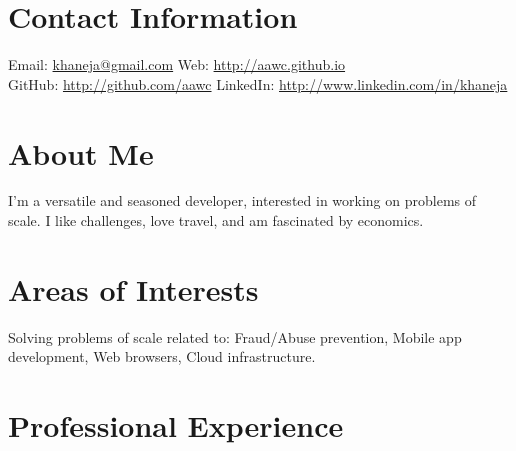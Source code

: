 \documentclass[margin,line]{resume}
\begin{document}
	\begin{resume}

	\section{Contact Information}

	Email: \href{mailto:khaneja@gmail.com}{khaneja@gmail.com} \hfill Web: \href{http://aawc.github.io}{http://aawc.github.io}\\
	GitHub: \href{http://github.com/aawc}{http://github.com/aawc} \hfill LinkedIn: \href{http://www.linkedin.com/in/khaneja}{http://www.linkedin.com/in/khaneja}

	\section{About Me}
	I'm a versatile and seasoned developer, interested in working on problems of scale. I like challenges, love travel, and am fascinated by economics.

	\section{Areas of Interests}
	Solving problems of scale related to: Fraud/Abuse prevention, Mobile app development, Web browsers, Cloud infrastructure.

	\section{Professional Experience}


\end{resume}
\end{document}
